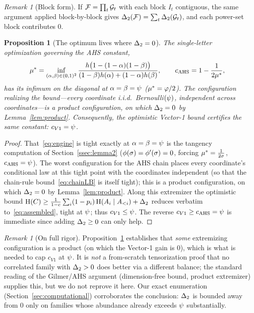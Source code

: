 \documentclass[11pt]{amsart}
\newtheorem{proposition}[theorem]{Proposition}
\theoremstyle{definition}
\theoremstyle{remark}
\newtheorem{remark}[theorem]{Remark}
\begin{document}
\begin{remark}[Block form]
If $\mathcal{F}=\prod_t\mathcal G_t$ with each block $I_t$ contiguous, the same argument
applied block-by-block gives $\Delta_2(\mathcal{F})=\sum_t\Delta_2(\mathcal G_t)$, and each
power-set block contributes $0$.
\end{remark}

\begin{proposition}[The optimum lives where $\Delta_2=0$]\label{prop:delta2}
The single-letter optimization governing the AHS constant,
\[
   \mu^\ast=\inf_{(\alpha,\beta)\in(0,1)^2}
   \frac{h\bigl(1-(1-\alpha)(1-\beta)\bigr)}{(1-\beta)h(\alpha)+(1-\alpha)h(\beta)},
   \qquad c_{\mathrm{AHS}}=1-\frac{1}{2\mu^\ast},
\]
has its infimum on the diagonal at $\alpha=\beta=\psi$ ($\mu^\ast=\varphi/2$). The
configuration realizing the bound---every coordinate i.i.d.\ Bernoulli$(\psi)$,
independent across coordinates---is a product configuration, on which $\Delta_2=0$ by
Lemma~\ref{lem:product}. Consequently, the optimistic Vector-1 bound certifies the
same constant: $c_{V1}=\psi$.
\end{proposition}

\begin{proof}
That~\eqref{eq:engine} is tight exactly at $\alpha=\beta=\psi$ is the tangency
computation of Section~\ref{ssec:lemma2} ($\phi(\sigma)=\phi'(\sigma)=0$, forcing
$\mu^\ast=\tfrac1{2\sigma}$, $c_{\mathrm{AHS}}=\psi$). The worst configuration for the AHS
chain places every coordinate's conditional law at this tight point with the
coordinates independent (so that the chain-rule bound~\eqref{eq:chainLB} is itself
tight); this is a product configuration, on which $\Delta_2=0$ by
Lemma~\ref{lem:product}. Along this extremizer the optimistic bound
$\operatorname{H}(C)\ge\tfrac1{1-c}\sum_i(1-p_i)\operatorname{H}(A_i\mid A_{<i})+\Delta_2$ reduces verbatim
to~\eqref{eq:assembled}, tight at $\psi$; thus $c_{V1}\le\psi$. The reverse
$c_{V1}\ge c_{\mathrm{AHS}}=\psi$ is immediate since adding $\Delta_2\ge 0$ can only help.
\end{proof}

\begin{remark}[On full rigor]\label{rmk:v1-rigor}
Proposition~\ref{prop:delta2} establishes that \emph{some} extremizing
configuration is a product (on which the Vector-1 gain is $0$), which is what is
needed to cap $c_{V1}$ at $\psi$. It is \emph{not} a from-scratch tensorization
proof that no correlated family with $\Delta_2>0$ does better via a different
balance; the standard reading of the Gilmer/AHS argument (dimension-free bound,
product extremizer) supplies this, but we do not reprove it here. Our exact
enumeration (Section~\ref{sec:computational}) corroborates the conclusion: $\Delta_2$
is bounded away from $0$ only on families whose abundance already exceeds
$\psi$ substantially.
\end{remark}
\end{document}
